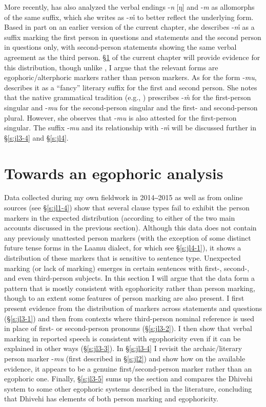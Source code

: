 \documentclass[output=paper]{langsci/langscibook}
\begin{document}
 More recently, \cite[138–140]{Gnanadesikan2017} has also analyzed the verbal endings -\textit{n} [ŋ] and ‑\textit{m} as allomorphs of the same suffix, which she writes as -\textit{m̊} to better reflect the underlying form. Based in part on an earlier version of the current chapter, she describes ‑\textit{m̊} as a suffix marking the first person in questions and statements and the second person in questions only, with second-person statements showing the same verbal agreement as the third person. §\ref{s:jl3} of the current chapter will provide evidence for this distribution, though unlike \citeauthor{Gnanadesikan2017}, I argue that the relevant forms are egophoric/alterphoric markers rather than person markers. As for the form ‑\textit{mu}, \cite[138–140]{Gnanadesikan2017} describes it as a “fancy” literary suffix for the first and second person. She notes that the native grammatical tradition (e.g., \citealt{Ahmad1970}) prescribes -\textit{m}̊ for the first-person singular and -\textit{mu} for the second-person singular and the first- and second-person plural. However, she observes that ‑\textit{mu} is also attested for the first-person singular. The suffix ‑\textit{mu} and its relationship with ‑\textit{m̊} will be discussed further in §‎\ref{s:jl3-4} and §\ref{s:jl4}.

\section{Towards an egophoric analysis}\label{s:jl3}

Data collected during my own fieldwork in 2014‒2015 as well as from online sources (see §‎\ref{s:jl1-4}) show that several clause types fail to exhibit the person markers in the expected distribution (according to either of the two main accounts discussed in the previous section). Although this data does not contain any previously unattested person markers (with the exception of some distinct future tense forms in the Laamu dialect, for which see §\ref{s:jl4-1}), it shows a distribution of these markers that is sensitive to sentence type. Unexpected marking (or lack of marking) emerges in certain sentences with first-, second-, and even third-person subjects. In this section I will argue that the data form a pattern that is mostly consistent with egophoricity rather than person marking, though to an extent some features of person marking are also present. I first present evidence from the distribution of markers across statements and questions (§‎\ref{s:jl3-1}) and then from contexts where third-person nominal reference is used in place of first- or second-person pronouns (§\ref{s:jl3-2}‎). I then show that verbal marking in reported speech is consistent with egophoricity even if it can be explained in other ways (§‎\ref{s:jl3-3}). In §\ref{s:jl3-4}‎ I revisit the archaic/literary person marker -\textit{mu} (first described in §\ref{s:jl2}‎) and show how on the available evidence, it appears to be a genuine first/second-person marker rather than an egophoric one. Finally, §\ref{s:jl3-5}‎ sums up the section and compares the Dhivehi system to some other egophoric systems described in the literature, concluding that Dhivehi has elements of both person marking and egophoricity.
\end{document}
